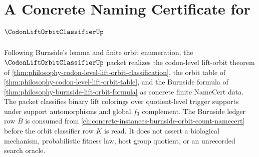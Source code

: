 \chapter{A Concrete Naming Certificate for $\CodonLiftOrbitClassifierUp$}
\label{ch:concrete-instances-codon-lift-orbit-classifier-namecert}

Following Burnside's lemma and finite orbit enumeration, the $\CodonLiftOrbitClassifierUp$ packet realizes the codon-level lift-orbit theorem of \autoref{thm:philosophy-codon-level-lift-orbit-classification}, the orbit table of \autoref{thm:philosophy-codon-level-lift-orbit-table}, and the Burnside formula of \autoref{thm:philosophy-burnside-lift-orbit-formula} as concrete finite NameCert data. The packet classifies binary lift colorings over quotient-level trigger supports under support automorphisms and global $f_{3}$ complement. The Burnside ledger row $B$ is consumed from \autoref{ch:concrete-instances-burnside-orbit-count-namecert} before the orbit classifier row $K$ is read. It does not assert a biological mechanism, probabilistic fitness law, host group quotient, or an unrecorded search oracle.

